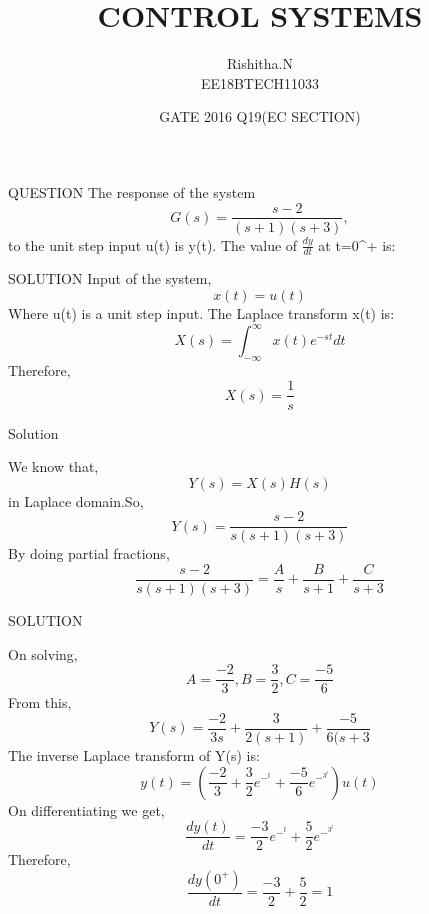 \documentclass{beamer}
\title{CONTROL SYSTEMS}
\author{Rishitha.N\\EE18BTECH11033}
\date{GATE 2016 Q19(EC SECTION)}
\begin{document}
\maketitle
\begin{frame}{QUESTION}
The response of the system
\begin{equation}
            G(s)= \frac{s-2}{(s+1)(s+3)} ,
 \end{equation} 
to the unit step input u(t) is y(t). The value of \(\frac{dy}{dt}\) at t=0^+ is:
\end{frame}
\begin{frame}{SOLUTION}
Input of the system,
\begin{equation}
     x(t) = u(t) 
\end{equation}
 Where u(t) is a unit step input.
 The Laplace transform x(t) is:
 \begin{equation}
     X(s) =  \int_{-\infty}^{\infty}x(t) e^{-st} dt
 \end{equation}
 Therefore,
 \begin{equation}
     X(s) =  \frac{1}{s}
 \end{equation}

\end{frame}
\begin{frame}{Solution}
  \begin{itemize}
We know that, 
\begin{equation}
  Y(s) = X(s)H(s)
\end{equation}
in Laplace domain.So,
\begin{equation}
Y(s) = \frac{s-2}{s(s+1)(s+3)}
\end{equation}
By doing partial fractions,
\begin{equation}
    \frac{s-2}{s(s+1)(s+3)} = \frac{A}{s} + \frac{B}{s+1} + \frac{C}{s+3} 
\end{equation}
\end{itemize}

\end{frame}

\begin{frame}{SOLUTION}
  
 On solving,
\begin{equation}
A = \frac{-2}{3} , B = \frac{3}{2} , C= \frac{-5}{6}
\end{equation}
From this,
\begin{equation}
    Y(s) = \frac{-2}{3s} + \frac{3}{2(s+1)} + \frac{-5}{6(s+3}
\end{equation}
The inverse Laplace transform of Y(s) is:
\begin{equation}
        y(t) = (\frac{-2}{3}+\frac{3}{2}e^-^t + \frac{-5}{6}e^-^3^t)u(t)
\end{equation}
On differentiating we get,
\begin{equation}
    \frac{dy(t)}{dt} = \frac{-3}{2}e^-^t + \frac{5}{2}e^-^3^t
\end{equation}
Therefore,
 \begin{equation}
    \frac{dy(0^+)}{dt} = \frac{-3}{2} + \frac{5}{2} = 1
\end{equation}


 
\end{frame}
\end{document}
